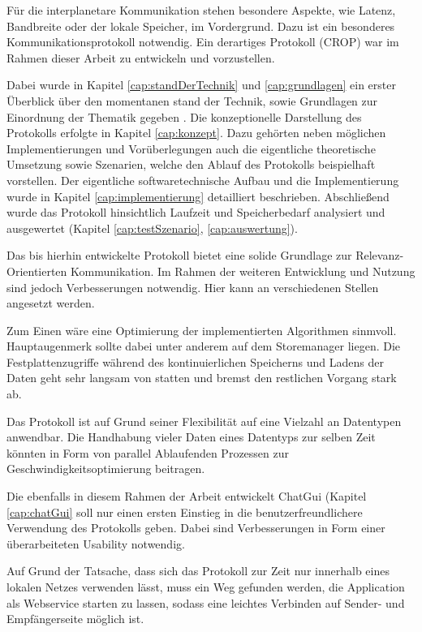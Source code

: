 Für die interplanetare Kommunikation stehen besondere Aspekte, wie Latenz,
Bandbreite oder der lokale Speicher, im Vordergrund. Dazu ist ein besonderes
Kommunikationsprotokoll notwendig. Ein derartiges Protokoll (CROP) war im Rahmen
dieser Arbeit zu entwickeln und vorzustellen.

Dabei wurde in Kapitel \ref{cap:standDerTechnik} und \ref{cap:grundlagen} ein
erster Überblick über den momentanen stand der Technik, sowie Grundlagen zur
Einordnung der Thematik gegeben .
Die konzeptionelle Darstellung des Protokolls erfolgte in Kapitel
\ref{cap:konzept}. Dazu gehörten neben möglichen Implementierungen und
Vorüberlegungen auch die eigentliche theoretische Umsetzung sowie Szenarien,
welche den Ablauf des Protokolls beispielhaft vorstellen. Der eigentliche
softwaretechnische Aufbau und die Implementierung wurde in Kapitel
\ref{cap:implementierung} detailliert beschrieben. Abschließend wurde das
Protokoll hinsichtlich Laufzeit und Speicherbedarf analysiert und ausgewertet
(Kapitel \ref{cap:testSzenario}, \ref{cap:auswertung}). 

Das bis hierhin entwickelte Protokoll bietet eine solide Grundlage zur
Relevanz-Orientierten Kommunikation. Im Rahmen der weiteren Entwicklung und
Nutzung sind jedoch Verbesserungen notwendig. Hier kann an verschiedenen Stellen
angesetzt werden.

Zum Einen wäre eine Optimierung der implementierten Algorithmen sinmvoll.
Hauptaugenmerk sollte dabei unter anderem auf dem Storemanager liegen. Die
Festplattenzugriffe während des kontinuierlichen Speicherns und Ladens der Daten
geht sehr langsam von statten und bremst den restlichen Vorgang stark ab.

Das Protokoll ist auf Grund seiner Flexibilität auf eine Vielzahl an Datentypen
anwendbar. Die Handhabung vieler Daten eines Datentyps zur selben Zeit könnten
in Form von parallel Ablaufenden Prozessen zur Geschwindigkeitsoptimierung
beitragen.

Die ebenfalls in diesem Rahmen der Arbeit entwickelt ChatGui (Kapitel
\ref{cap:chatGui} soll nur einen ersten Einstieg in die benutzerfreundlichere
Verwendung des Protokolls geben. Dabei sind Verbesserungen in Form einer
überarbeiteten Usability notwendig.

Auf Grund der Tatsache, dass sich das Protokoll zur Zeit nur innerhalb eines
lokalen Netzes verwenden lässt, muss ein Weg gefunden werden, die Application
als Webservice starten zu lassen, sodass eine leichtes Verbinden auf Sender- und
Empfängerseite möglich ist.



